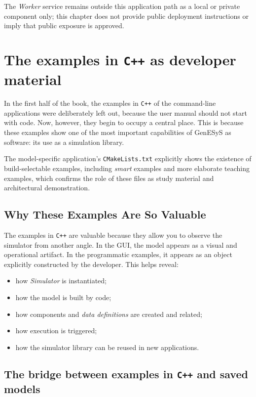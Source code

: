 The \textit{Worker} service remains outside this application path as a local or private component only; this chapter does not provide public deployment instructions or imply that public exposure is approved.

\section{The examples in \texttt{C++} as developer material}
\label{sec:cap10_exemplos_cpp_material_desenvolvedor}

In the first half of the book, the examples in \texttt{C++} of the command-line applications were deliberately left out, because the user manual should not start with code. Now, however, they begin to occupy a central place. This is because these examples show one of the most important capabilities of GenESyS as software: its use as a simulation library.

The model-specific application's \texttt{CMakeLists.txt} explicitly shows the existence of build-selectable examples, including \textit{smart} examples and more elaborate teaching examples, which confirms the role of these files as study material and architectural demonstration.

\subsection{Why These Examples Are So Valuable}
\label{subsec:cap10_por_que_exemplos_tao_valiosos}

The examples in \texttt{C++} are valuable because they allow you to observe the simulator from another angle. In the GUI, the model appears as a visual and operational artifact. In the programmatic examples, it appears as an object explicitly constructed by the developer. This helps reveal:
\begin{itemize}
 \item how \textit{Simulator} is instantiated;
 \item how the model is built by code;
 \item how components and \textit{data definitions} are created and related;
 \item how execution is triggered;
 \item how the simulator library can be reused in new applications.
\end{itemize}

\subsection{The bridge between examples in \texttt{C++} and saved models}
\label{subsec:cap10_ponte_exemplos_cpp_modelos_salvos}

